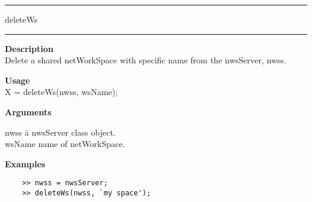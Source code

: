 \rule[0.06in]{6in}{0.01in}
\newline
deleteWs
\newline
\rule{6in}{0.01in}
\begin{list}{}{}
	\item {\bf Description}\\
	Delete a shared netWorkSpace with specific name from the nwsServer, nwss. 
	\item {\bf Usage}\\
	X = deleteWs(nwss, wsName);
	\item {\bf Arguments}
		\begin{tabbing}
		nwss \hspace{2.5cm} \= a nwsServer class object. \\
		wsName \> name of netWorkSpace.
		\end{tabbing}	
	\item {\bf Examples}
	\begin{verbatim}
	>> nwss = nwsServer;
	>> deleteWs(nwss, `my space');
	\end{verbatim}
\end{list}
